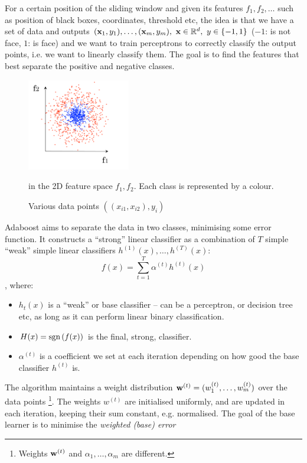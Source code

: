 \documentclass[a4paper]{article}
\begin{document}
For a certain position of the sliding window and given its features $f_1,f_2,\ldots$ such as position of black boxes, coordinates, threshold etc, the idea is that we have a set of data and outputs $(\textbf{x}_1, y_1), \ldots, (\textbf{x}_m, y_m),\ \textbf{x} \in \mathbb{R}^d,\ y \in \{-1,1\}$ ($-1$: is not face, $1$: is face) and we want to train perceptrons to correctly classify the output points, i.e. we want to linearly classify them. The goal is to find the features that best separate the positive and negative classes. 
\begin{figure}[H]
    \centering
    \includegraphics[height=4cm]{img/feature_pts.png}
    \caption{Various data points $\left((x_{i1},x_{i2}),y_i\right)$} in the 2D feature space $f_1,f_2$. Each class is represented by a colour.
\end{figure}
Adaboost aims to separate the data in two classes, minimising some error function. It constructs a ``strong'' linear classifier as a combination of $T$ simple ``weak'' simple linear classifiers $h^{(1)}(x), \ldots, h^{(T)}(x)$:
\begin{equation}
    f(x) = \sum\limits_{t=1}^{T}{\alpha^{(t)}h^{(t)}(x)}
\end{equation}
, where:
\begin{itemize}
    \item $h_t(x)$ is a ``weak'' or base classifier -- can be a perceptron, or decision tree etc, as long as it can perform linear binary classification.    
    \item $H(x) = \textup{sgn}\left(f(x)\right)$ is the final, strong, classifier.
    \item $\alpha^{(t)}$ is a coefficient we set at each iteration depending on how good the base classifier $h^{(t)}$ is.
\end{itemize}
The algorithm maintains a weight distribution $\textbf{w}^{(t)} = (w^{(t)}_1,\ldots,w^{(t)}_m)$ over the data points \footnote{Weights $\textbf{w}^{(t)}$ and $\alpha_1,\ldots,\alpha_m$ are different.}. The weights $w^{(t)}$ are initialised uniformly, and are updated in each iteration, keeping their sum constant, e.g. normalised. The goal of the base learner is to minimise the \textit{weighted (base) error}
\end{document}
